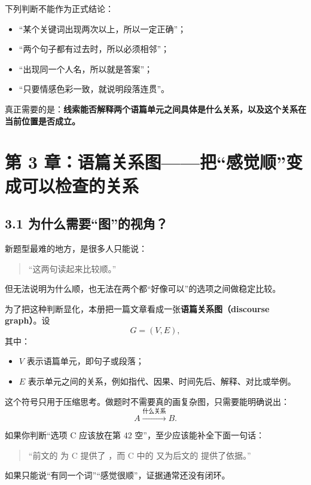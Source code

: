 \documentclass[11pt,a4paper]{ctexart}
\newcommand{\kw}[1]{\textbf{#1}}
\newcommand{\term}[2]{\textbf{#1（#2）}}
\begin{document}
\begin{warn}[必须避免的机械规则]
下列判断不能作为正式结论：
\begin{itemize}
  \item “某个关键词出现两次以上，所以一定正确”；
  \item “两个句子都有过去时，所以必须相邻”；
  \item “出现同一个人名，所以就是答案”；
  \item “只要情感色彩一致，就说明段落连贯”。
\end{itemize}
真正需要的是：\kw{线索能否解释两个语篇单元之间具体是什么关系，以及这个关系在当前位置是否成立。}
\end{warn}

\newpage
\section{第 3 章：语篇关系图——把“感觉顺”变成可以检查的关系}

\subsection{3.1 为什么需要“图”的视角？}
新题型最难的地方，是很多人只能说：
\begin{quote}
“这两句读起来比较顺。”
\end{quote}
但无法说明为什么顺，也无法在两个都“好像可以”的选项之间做稳定比较。

为了把这种判断显化，本册把一篇文章看成一张\term{语篇关系图}{discourse graph}。设
\[
G=(V,E),
\]
其中：
\begin{itemize}
  \item $V$ 表示语篇单元，即句子或段落；
  \item $E$ 表示单元之间的关系，例如指代、因果、时间先后、解释、对比或举例。
\end{itemize}
这个符号只用于压缩思考。做题时不需要真的画复杂图，只需要能明确说出：
\[
A\xrightarrow{\text{什么关系}}B.
\]

\begin{exam}[实操标准]
如果你判断“选项 C 应该放在第 42 空”，至少应该能补全下面一句话：
\begin{quote}
“前文的 \underline{\hspace{2cm}} 为 C 提供了 \underline{\hspace{2cm}}，而 C 中的 \underline{\hspace{2cm}} 又为后文的 \underline{\hspace{2cm}} 提供了依据。”
\end{quote}
如果只能说“有同一个词”“感觉很顺”，证据通常还没有闭环。
\end{exam}
\end{document}
